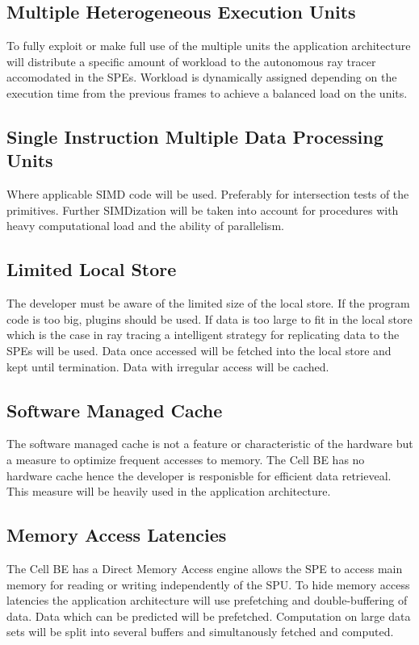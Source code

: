 \documentclass[DIV10, abstracton, openright, footsepline, headsepline, twoside, 9pt,
bigheadings]{scrreprt}
\begin{document}
\subsection{Multiple Heterogeneous Execution Units}
\label{sec:multiple}
To fully exploit or make full use of the multiple units the application
architecture will distribute a specific amount of workload to the
autonomous ray tracer accomodated in the SPEs. Workload is dynamically
assigned depending on the execution time from the previous frames to
achieve a balanced load on the units.


\subsection{Single Instruction Multiple Data Processing Units}
\label{sec:simd}
Where applicable SIMD code will be used. Preferably for intersection tests
of the primitives. Further SIMDization will be taken into account for
procedures with heavy computational load and the ability of parallelism.

\subsection{Limited Local Store}
\label{sec:ls}
The developer must be aware of the limited size of the local store. If the
program code is too big, plugins should be used. If data is too large to
fit in the local store which is the case in ray tracing a intelligent
strategy for replicating data to the SPEs will be used. Data once accessed
will be fetched into the local store and kept until termination. Data
with irregular access will be cached.


\subsection{Software Managed Cache}
\label{sec:smc}
The software managed cache is not a feature or characteristic of the hardware
but a measure to optimize frequent accesses to memory. The Cell BE has no
hardware cache hence the developer is responisble for efficient data retrieveal.
This measure will be heavily used in the application architecture.


\subsection{Memory Access Latencies}
\label{sec:memlat}
The Cell BE has a Direct Memory Access engine allows the SPE to access main memory
for reading or writing independently of the SPU. To hide memory access latencies
the application architecture will use prefetching and double-buffering of data.
Data which can be predicted will be prefetched. Computation on large data sets
will be split into several buffers and simultanously fetched and computed.
\end{document}
